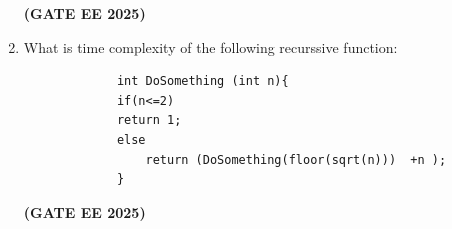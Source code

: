 \documentclass[journal,12pt,onecolumn]{IEEEtran}
\theoremstyle{remark}
\begin{document}
\begin{enumerate}
\begin{enumerate}
         \end{enumerate}
         \hfill \textbf{(GATE EE 2025)}
         \item What is time complexity of the following recurssive function: 
         \begin{verbatim}
             int DoSomething (int n){
             if(n<=2) 
             return 1;
             else
                 return (DoSomething(floor(sqrt(n)))  +n );
             }
         \end{verbatim}
         \begin{enumerate}
         \end{enumerate}
   
        \hfill \textbf{(GATE EE 2025)}
         

\end{enumerate}
\end{document}
